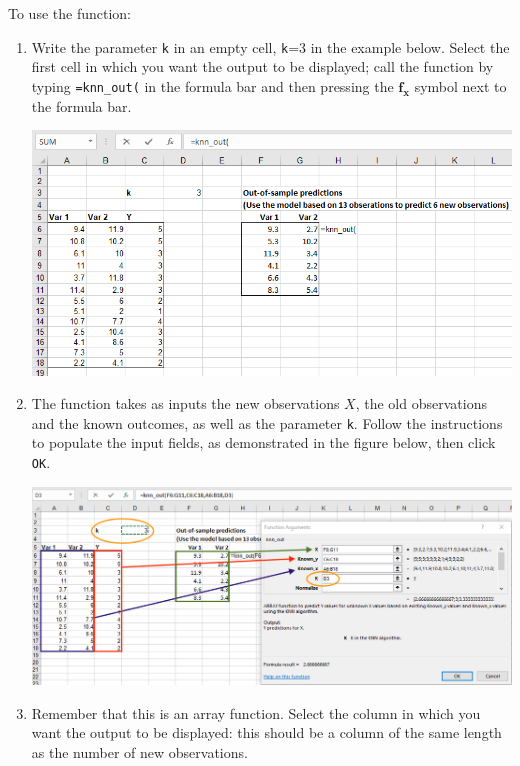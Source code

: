 \documentclass[12pt]{article}
\begin{document}
To use the function:
\begin{enumerate}
\item Write the parameter \texttt{k} in an empty cell, \texttt{k}=3 in the example below. Select the first cell in which you want the output to be displayed; call the function by typing \texttt{=knn\_out(} in the formula bar and then pressing the $\boldsymbol{f_x}$ symbol next to the formula bar.

\medskip

\centerline{\includegraphics[width=5in]{figures/knnout1}}

\medskip

\item The function takes as inputs the new observations $X$, the old observations and the known outcomes, as well as the parameter \texttt{k}. Follow the instructions to populate the input fields, as demonstrated in the figure below, then click \texttt{OK}.

\medskip

\centerline{\includegraphics[width=5in]{figures/knnout2}}

\medskip

\item Remember that this is an array function. Select the column in which you want the output to be displayed: this should be a column of the same length as the number of new observations.


\end{enumerate}
\end{document}
